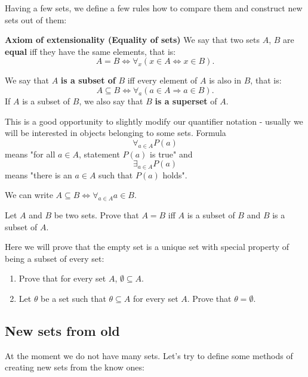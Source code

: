 Having a few sets, we define a few rules how to compare them and construct new sets out of them:

\begin{definition}
  \textbf{Axiom of extensionality (Equality of sets)} We say that two sets $A$, $B$ are \textbf{equal} iff they have the same elements, that is:
  $$A=B\Leftrightarrow \forall_x (x\in A \Leftrightarrow x\in B).$$
\end{definition}

\begin{definition}
  We say that $A$ \textbf{is a subset of} $B$ iff every element of $A$ is also in $B$, that is:
  $$A\subseteq B \Leftrightarrow \forall_a (a\in A\Rightarrow a\in B).$$
  If $A$ is a subset of $B$, we also say that $B$ \textbf{is a superset} of $A$.
\end{definition}

This is a good opportunity to slightly modify our quantifier notation - usually we will be interested in objects belonging to some sets.
Formula $$\forall_{a\in A} P(a)$$ means "for all $a\in A$, statement $P(a)$ is true"
and $$\exists_{a\in A} P(a)$$ means "there is an $a\in A$ such that $P(a)$ holds".

\begin{example}
  We can write $A\subseteq B \Leftrightarrow \forall_{a\in A} a\in B$.
\end{example}

\begin{exercise}
  Let $A$ and $B$ be two sets. Prove that $A=B$ iff $A$ is a subset of $B$ and $B$ is a subset of $A$.
\end{exercise}

\begin{exercise}
  Here we will prove that the empty set is a unique set with special property of being a subset of every set:
  \begin{enumerate}
    \item Prove that for every set $A$, $\emptyset\subseteq A$.
    \item Let $\theta$ be a set such that $\theta \subseteq A$ for every set $A$. Prove that $\theta=\emptyset$.
  \end{enumerate}
\end{exercise}

\subsection{New sets from old}
At the moment we do not have many sets. Let's try to define some methods of creating new sets from the know ones:

